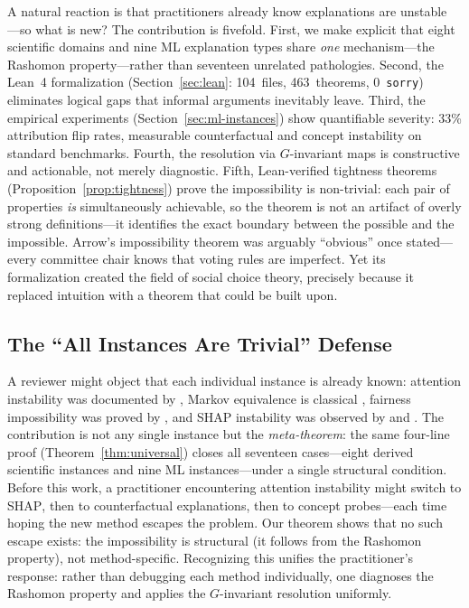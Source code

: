 \documentclass[11pt,a4paper]{article}
\newcommand{\SHAP}{\textsc{SHAP}}
\begin{document}
A natural reaction is that practitioners already know explanations are unstable
---so what is new?  The contribution is fivefold.  First, we make explicit that
eight scientific domains and nine ML explanation types share \emph{one}
mechanism---the Rashomon property---rather than seventeen unrelated
pathologies.  Second, the Lean~4
formalization (Section~\ref{sec:lean}: 104~files, 463~theorems, 0~\texttt{sorry})
eliminates logical gaps that informal arguments inevitably leave.  Third, the
empirical experiments (Section~\ref{sec:ml-instances}) show quantifiable severity:
33\% attribution flip rates, measurable counterfactual and concept instability on
standard benchmarks.  Fourth, the resolution via $G$-invariant maps is
constructive and actionable, not merely diagnostic.  Fifth, Lean-verified
tightness theorems (Proposition~\ref{prop:tightness}) prove the impossibility
is non-trivial: each pair of properties \emph{is} simultaneously achievable,
so the theorem is not an artifact of overly strong definitions---it identifies
the exact boundary between the possible and the impossible.
Arrow's impossibility
theorem \citep{arrow1951social} was arguably ``obvious'' once stated---every
committee chair knows that voting rules are imperfect.  Yet its formalization
created the field of social choice theory, precisely because it replaced
intuition with a theorem that could be built upon.

\subsection[The All Instances Are Trivial Defense]{The ``All Instances Are Trivial'' Defense}
\label{sec:trivial}

A reviewer might object that each individual instance is already known: attention
instability was documented by \citet{jainwallace2019}, Markov equivalence is
classical \citep{verma1991equivalence}, fairness impossibility was proved by
\citet{chouldechova2017fair}, and \SHAP{} instability was observed by
\citet{damour2022underspecification} and \citet{krishna2022disagreement}.  The
contribution is not any single instance but the \emph{meta-theorem}: the same
four-line proof (Theorem~\ref{thm:universal}) closes all seventeen cases---eight
derived scientific instances and nine ML instances---under a
single structural condition.  Before this work, a practitioner encountering
attention instability might switch to \SHAP{}, then to counterfactual
explanations, then to concept probes---each time hoping the new method escapes
the problem.  Our theorem shows that no such escape exists: the impossibility
is structural (it follows from the Rashomon property), not method-specific.
Recognizing this unifies the practitioner's response: rather than debugging each
method individually, one diagnoses the Rashomon property and applies the
$G$-invariant resolution uniformly.
\end{document}

